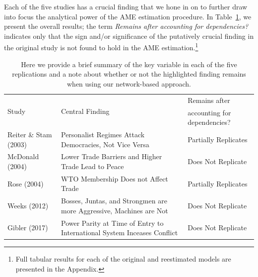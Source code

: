 \documentclass{article}[12pt]
\begin{document}
Each of the five studies has a crucial finding that we hone in on to
further draw into focus the analytical power of the AME estimation
procedure.  In Table~\ref{tab:modelFindingSumm}, we present the
overall results; the term \textit{Remains after accounting for
  dependencies?} indicates only that the sign and/or significance of
the putatively crucial finding in the original study is not found to
hold in the AME estimation.\footnote{Full tabular results for each of
  the original and reestimated models are presented in the Appendix.}

\begin{table}[ht]
\centering
\caption{Here we provide a brief summary of the key variable in each
  of the five replications and a note about whether or not the
  highlighted finding remains when using our network-based approach.}
	\begin{tabular}{l p{7cm} l} \toprule
		\multirow{2}{*}{Study} & \multirow{2}{*}{Central
                  Finding} &  Remains after \\ 
			& &  accounting for dependencies? \\ \toprule
		Reiter \& Stam (2003) & Personalist Regimes Attack Democracies, Not Vice Versa & {Partially Replicates} \\ \midrule
		McDonald (2004) & Lower Trade Barriers and Higher Trade Lead to Peace & {Does Not Replicate}\\ \midrule
		Rose (2004) & WTO Membership Does not Affect Trade & {Partially Replicates}\\ \midrule
		Weeks (2012) & Bosses, Juntas, and Strongmen are more Aggressive, Machines are Not & {Does Not Replicate} \\\midrule
		Gibler (2017) & Power Parity at Time of Entry to International System Inceases Conflict & {Does Not Replicate}\\ \bottomrule
	\end{tabular}
	\label{tab:modelFindingSumm}
\end{table}
\end{document}
